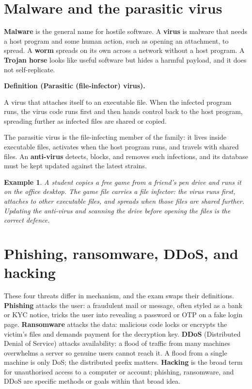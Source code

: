 \documentclass[11pt]{article}
\newtheorem{example}{Example}[section]
\newenvironment{definitionbox}[1]{%
  \par\noindent\textbf{Definition (#1).}\ \itshape
}{\par\vspace{0.3em}}
\begin{document}
\section{Malware and the parasitic virus}
\textbf{Malware} is the general name for hostile software. A \textbf{virus}
is malware that needs a host program and some human action, such as opening
an attachment, to spread. A \textbf{worm} spreads on its own across a
network without a host program. A \textbf{Trojan horse} looks like useful
software but hides a harmful payload, and it does not self-replicate.

\begin{definitionbox}{Parasitic (file-infector) virus}
A virus that attaches itself to an executable file. When the infected program
runs, the virus code runs first and then hands control back to the host
program, spreading further as infected files are shared or copied.
\end{definitionbox}

The parasitic virus is the file-infecting member of the family: it lives
inside executable files, activates when the host program runs, and travels
with shared files. An \textbf{anti-virus} detects, blocks, and removes such
infections, and its database must be kept updated against the latest strains.

\begin{example}
A student copies a free game from a friend's pen drive and runs it on the
office desktop. The game file carries a file infector: the virus runs first,
attaches to other executable files, and spreads when those files are shared
further. Updating the anti-virus and scanning the drive before opening the
files is the correct defence.
\end{example}

\section{Phishing, ransomware, DDoS, and hacking}
These four threats differ in mechanism, and the exam swaps their definitions.
\textbf{Phishing} attacks the user: a fraudulent mail or message, often styled
as a bank or KYC notice, tricks the user into revealing a password or OTP on
a fake login page. \textbf{Ransomware} attacks the data: malicious code
locks or encrypts the victim's files and demands payment for the decryption
key. \textbf{DDoS} (Distributed Denial of Service) attacks availability: a
flood of traffic from many machines overwhelms a server so genuine users
cannot reach it. A flood from a single machine is only DoS; the distributed
prefix matters. \textbf{Hacking} is the broad term for unauthorised access to
a computer or account; phishing, ransomware, and DDoS are specific methods or
goals within that broad idea.
\end{document}
